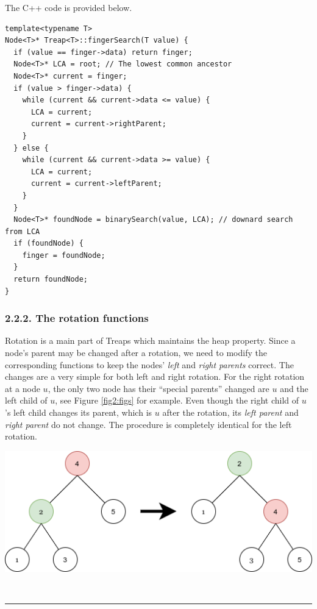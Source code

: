 \documentclass[12pt,english,]{article}
\let\origfigure\figure
\let\endorigfigure\endfigure
\renewenvironment{figure}[1][2] {
    \expandafter\origfigure\expandafter[H]
} {
    \endorigfigure
}
\begin{document}
The C++ code is provided below.

\begin{lstlisting}
template<typename T>
Node<T>* Treap<T>::fingerSearch(T value) {
  if (value == finger->data) return finger;
  Node<T>* LCA = root; // The lowest common ancestor
  Node<T>* current = finger;
  if (value > finger->data) {
    while (current && current->data <= value) {
      LCA = current;
      current = current->rightParent;
    }
  } else {
    while (current && current->data >= value) {
      LCA = current;
      current = current->leftParent;
    }
  }
  Node<T>* foundNode = binarySearch(value, LCA); // downard search from LCA
  if (foundNode) {
    finger = foundNode;
  }
  return foundNode;
}
\end{lstlisting}

\vspace{-7mm}

\hypertarget{the-rotation-functions}{%
\subsubsection{2.2.2. The rotation
functions}\label{the-rotation-functions}}

Rotation is a main part of Treaps which maintains the heap property.
Since a node's parent may be changed after a rotation, we need to modify
the corresponding functions to keep the nodes' \emph{left} and
\emph{right parents} correct. The changes are a very simple for both
left and right rotation. For the right rotation at a node \(u\), the
only two node has their ``special parents'' changed are \(u\) and the
left child of \(u\), see Figure \ref{fig2:figs} for example. Even though
the right child of \(u\)'s left child changes its parent, which is \(u\)
after the rotation, its \emph{left parent} and \emph{right parent} do
not change. The procedure is completely identical for the left rotation.

\begin{figure}
\centering
\vspace{1mm}
\includegraphics[height=0.3\textwidth]{TreeRotation.png}
\caption{\label{fig2:figs}Visualization of right rotation at node 4. The colored nodes are ones has their \textit{left parent} or \textit{right parent} changed. The \textit{right parent} of node 2, the left child of 4, changed to the \textit{right parent} of 4, and \textit{left parent} of node 4 changed to 2. Left rotation is identical.}

\  
\hrule
\end{figure}
\end{document}
